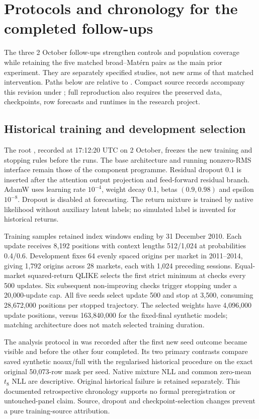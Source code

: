 \section{Protocols and chronology for the completed follow-ups}
\label{sec:followup-methods}

The three 2 October follow-ups strengthen controls and population coverage while retaining the five matched broad--Mat\'ern pairs as the main prior experiment. They are separately specified studies, not new arms of that matched intervention. Paths below are relative to . Compact source records accompany this revision under ; full reproduction also requires the preserved data, checkpoints, row forecasts and runtimes in the research project.

\subsection{Historical training and development selection}

The root , recorded at 17:12:20 UTC on 2 October, freezes the new training and stopping rules before the runs. The base architecture and running nonzero-RMS interface remain those of the component programme. Residual dropout 0.1 is inserted after the attention output projection and feed-forward residual branch. AdamW uses learning rate $10^{-4}$, weight decay 0.1, betas $(0.9,0.98)$ and epsilon $10^{-8}$. Dropout is disabled at forecasting. The return mixture is trained by native likelihood without auxiliary latent labels; no simulated label is invented for historical returns.

Training samples retained index windows ending by 31 December 2010. Each update receives 8,192 positions with context lengths 512/1,024 at probabilities 0.4/0.6. Development fixes 64 evenly spaced origins per market in 2011--2014, giving 1,792 origins across 28 markets, each with 1,024 preceding sessions. Equal-market squared-return QLIKE selects the first strict minimum at checks every 500 updates. Six subsequent non-improving checks trigger stopping under a 20,000-update cap. All five seeds select update 500 and stop at 3,500, consuming 28,672,000 positions per stopped trajectory. The selected weights have 4,096,000 update positions, versus 163,840,000 for the fixed-final synthetic models; matching architecture does not match selected training duration.

The analysis protocol in  was recorded after the first new seed outcome became visible and before the other four completed. Its two primary contrasts compare saved synthetic noaux/full with the regularised historical procedure on the exact original 50,073-row mask per seed. Native mixture NLL and common zero-mean $t_8$ NLL are descriptive. Original historical failure is retained separately. This documented retrospective chronology supports no formal preregistration or untouched-panel claim. Source, dropout and checkpoint-selection changes prevent a pure training-source attribution.

